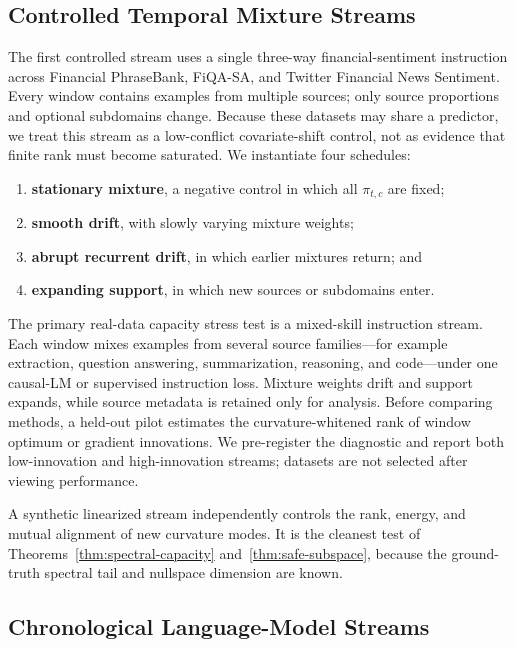 \subsection{Controlled Temporal Mixture Streams}

The first controlled stream uses a single three-way financial-sentiment
instruction across Financial PhraseBank, FiQA-SA, and Twitter Financial News
Sentiment. Every window contains examples from multiple sources; only source
proportions and optional subdomains change. Because these datasets may share a
predictor, we treat this stream as a low-conflict covariate-shift control, not
as evidence that finite rank must become saturated. We instantiate four
schedules:
\begin{enumerate}
  \item \textbf{stationary mixture}, a negative control in which all
  $\pi_{t,c}$ are fixed;
  \item \textbf{smooth drift}, with slowly varying mixture weights;
  \item \textbf{abrupt recurrent drift}, in which earlier mixtures return; and
  \item \textbf{expanding support}, in which new sources or subdomains enter.
\end{enumerate}

The primary real-data capacity stress test is a mixed-skill instruction stream.
Each window mixes examples from several source families---for example
extraction, question answering, summarization, reasoning, and code---under one
causal-LM or supervised instruction loss. Mixture weights drift and support
expands, while source metadata is retained only for analysis. Before comparing
methods, a held-out pilot estimates the curvature-whitened rank of window
optimum or gradient innovations. We pre-register the diagnostic and report both
low-innovation and high-innovation streams; datasets are not selected after
viewing \method{} performance.

A synthetic linearized stream independently controls the rank, energy, and
mutual alignment of new curvature modes. It is the cleanest test of
Theorems~\ref{thm:spectral-capacity} and~\ref{thm:safe-subspace}, because the
ground-truth spectral tail and nullspace dimension are known.

\subsection{Chronological Language-Model Streams}

